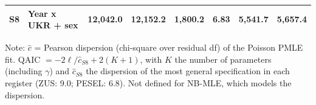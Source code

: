 \begin{table}[ht!]
\begin{tabular*}{\linewidth}{@{\extracolsep{\fill}}llrrrrrr}
S8 & Year x UKR + sex & 12,042.0 & 12,152.2 & 1,800.2 & 6.83 & 5,541.7 & 5,657.4 \\ 
\bottomrule
\end{tabular*}
\begin{minipage}{\linewidth}
\vspace{.05em}
Note: $\hat c$ = Pearson dispersion (chi-square over residual df) of the Poisson PMLE fit. QAIC $= -2\ell/\hat c_{S8} + 2(K+1)$, with $K$ the number of parameters (including $\gamma$) and $\hat c_{S8}$ the dispersion of the most general specification in each register (ZUS: 9.0; PESEL: 6.8). Not defined for NB-MLE, which models the dispersion.\\
\end{minipage}
\end{table}

